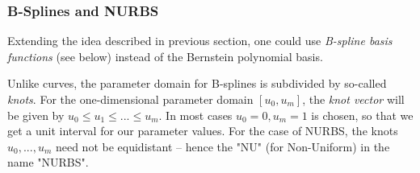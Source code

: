 \subsubsection{B-Splines and NURBS}
Extending the idea described in previous section, one could use \emph{B-spline basis functions} (see below) instead of the Bernstein polynomial basis.

Unlike \Bez curves, the parameter domain for B-splines is subdivided by so-called \textit{knots}. For the one-dimensional parameter domain $[u_{0}, u_{m}]$, the \textit{knot vector} will be given by $u_{0} \leq u_{1} \leq ... \leq u_{m}$. In most cases $u_{0} = 0, u_{m} = 1$ is chosen, so that we get a unit interval for our parameter values. For the case of NURBS, the knots $u_{0},..., u_{m}$ need not be equidistant -- hence the "NU" (for Non-Uniform) in the name "NURBS".

